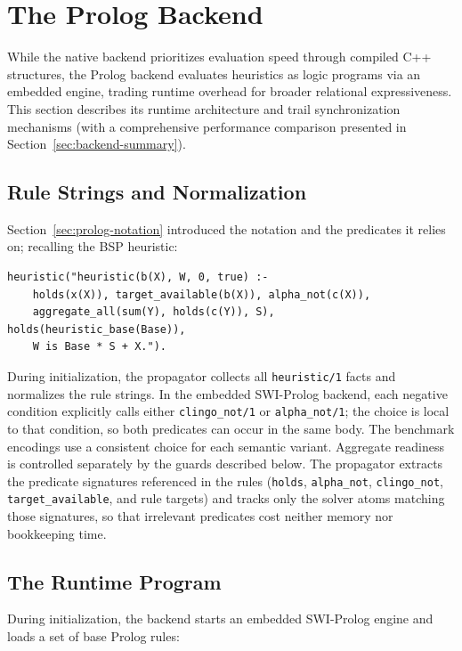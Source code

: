 \section{The Prolog Backend}

While the native backend prioritizes evaluation speed through compiled C++ structures, the Prolog backend evaluates heuristics as logic programs via an embedded engine, trading runtime overhead for broader relational expressiveness. This section describes its runtime architecture and trail synchronization mechanisms (with a comprehensive performance comparison presented in Section~\ref{sec:backend-summary}).

\subsection{Rule Strings and Normalization}
\label{sec:prolog-syntax}

Section~\ref{sec:prolog-notation} introduced the notation and the predicates it relies on; recalling the BSP heuristic:

\begin{verbatim}
heuristic("heuristic(b(X), W, 0, true) :-
    holds(x(X)), target_available(b(X)), alpha_not(c(X)),
    aggregate_all(sum(Y), holds(c(Y)), S), holds(heuristic_base(Base)),
    W is Base * S + X.").
\end{verbatim}

During initialization, the propagator collects all \texttt{heuristic/1} facts and normalizes the rule strings. In the embedded SWI-Prolog backend, each negative condition explicitly calls either \texttt{clingo\_not/1} or \texttt{alpha\_not/1}; the choice is local to that condition, so both predicates can occur in the same body. The benchmark encodings use a consistent choice for each semantic variant. Aggregate readiness is controlled separately by the guards described below. The propagator extracts the predicate signatures referenced in the rules (\texttt{holds}, \texttt{alpha\_not}, \texttt{clingo\_not}, \texttt{target\_available}, and rule targets) and tracks only the solver atoms matching those signatures, so that irrelevant predicates cost neither memory nor bookkeeping time.

\subsection{The Runtime Program}

During initialization, the backend starts an embedded SWI-Prolog engine \cite{wielemaker2012swipl} and loads a set of base Prolog rules:

